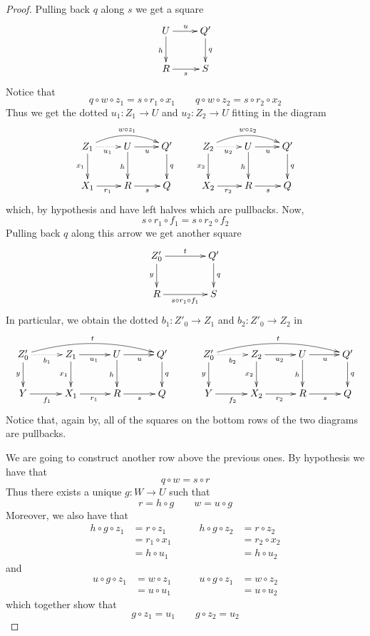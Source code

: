 \begin{proof}Pulling back  $q$ along $s$ we get a square 
	\[\xymatrix{U \ar[r]^{u} \ar[d]_{h}& Q' \ar[d]^{q}\\ R \ar[r]_s & S}\]
	Notice that
	\[
	q\circ w\circ z_1=s\circ r_1\circ x_1 \qquad 
	q\circ w\circ z_2=s\circ r_2\circ x_2 \]
	Thus we get the dotted $u_1\colon Z_1\to U$ and $u_2\colon Z_2\to U$ fitting in the diagram
	\[\xymatrix{  Z_1  \ar@/^.4cm/[rr]^{w\circ z_1}\ar@{.>}[r]_{u_1}\ar[d]_{x_1}&  U \ar[d]_h \ar[r]_{u} & Q'  \ar[d]^{q}&  Z_2 \ar@/^.4cm/[rr]^{w\circ z_2} \ar@{.>}[r]_{u_2}\ar[d]_{x_2} &  U \ar[d]_h \ar[r]_{u}& Q' \ar[d]^{q} \\  X_1 \ar[r]_{r_1} & R \ar[r]_s& Q & X_2 \ar[r]_{r_2}& R \ar[r]_s & Q}\]
	which, by hypothesis and   have left halves which are pullbacks. Now,
	\[s\circ r_1\circ f_1 =s\circ r_2\circ f_2\]
	Pulling back $q$ along this arrow we get another square
	\[\xymatrix@C=40pt{Z'_0 \ar[r]^{t} \ar[d]_{y}& Q' \ar[d]^{q}\\ R \ar[r]_{s\circ r_1\circ f_1} & S}\]
	In particular, we obtain the dotted $b_1\colon Z'_0\to Z_1$ and $b_2\colon Z'_0\to Z_2$ in
	\[\xymatrix@C=30pt{ Z'_0 \ar@/^.4cm/[rrr]^{t}\ar[d]_{y} \ar@{.>}[r]_{b_1} & Z_1  \ar[r]_{u_1}\ar[d]_{x_1}&  U \ar[d]_h \ar[r]_{u} & Q'  \ar[d]^{q} &Z'_0 \ar@/^.4cm/[rrr]^{t} \ar[d]_{y}\ar@{.>}[r]_{b_2}  & Z_2  \ar[r]_{u_2}\ar[d]_{x_2} &  U \ar[d]_h \ar[r]_{u}& Q' \ar[d]^{q} \\ Y \ar[r]_{f_1}& X_1 \ar[r]_{r_1} & R \ar[r]_s& Q & Y \ar[r]_{f_2} & X_2 \ar[r]_{r_2}& R \ar[r]_s & Q}\]
	Notice that, again  by, all of the squares on the bottom rows of the two diagrams are pullbacks. 
	
	We are going to construct another row above the previous ones. By hypothesis we have that
	\[q\circ w = s\circ r\]
	Thus there exists a unique $g\colon W\to U$ such that
	\[r=h\circ g \qquad w=u\circ g\]
	Moreover, we also have that
	\[\begin{split}h\circ g \circ z_1&=r \circ z_1\\&= r_1\circ x_1 \\&=h\circ u_1
	\end{split}\qquad\begin{split}h\circ g \circ z_2&=r \circ z_2\\&= r_2\circ x_2 \\&=h\circ u_2
	\end{split}\]
	and 
	\[\begin{split}u\circ g \circ z_1&=w \circ z_1\\&= u\circ u_1 
	\end{split} \qquad \begin{split}u\circ g \circ z_1&=w \circ z_2\\&= u\circ u_2
	\end{split}\]
	which together show that
	\[g\circ z_1=u_1 \qquad g\circ z_2=u_2\]
	

\end{proof}
